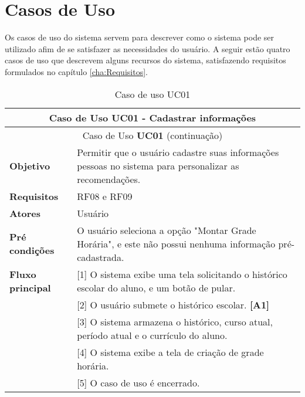 
\chapter{Casos de Uso}
\label{cha:Casos de Uso}

Os casos de uso do sistema servem para descrever como o sistema pode ser utilizado afim
de se satisfazer as necessidades do usuário. A seguir estão quatro casos de uso que descrevem alguns recursos do sistema, satisfazendo requisitos formulados no capítulo \ref{cha:Requisitos}.


\begin{longtable}{ | m{} | m{} | }
    
    \hline\hline
    
    \multicolumn{2}{|c|}{Caso de Uso \textbf{UC01} - Cadastrar informações}\tabularnewline\hline\hline
    \endfirsthead

    \hline\hline
    \multicolumn{2}{|c|}{Caso de Uso \textbf{UC01} (continuação)}\tabularnewline\hline\hline
    \endhead

    \hline
    \endfoot

    \hline
    \caption{Caso de uso UC01}
    \endlastfoot

    \textbf{Objetivo} & Permitir que o usuário cadastre suas informações pessoas no sistema para personalizar as recomendações.\tabularnewline\hline
    
    \textbf{Requisitos} & RF08 e RF09\tabularnewline\hline

    \textbf{Atores} & Usuário\tabularnewline\hline

    \textbf{Pré condições} & O usuário seleciona a opção "Montar Grade Horária", e este não possui nenhuma informação pré-cadastrada.\tabularnewline\hline

    \multirow{1}{*}{\textbf{Fluxo principal}} & [1] O sistema exibe uma tela solicitando o histórico escolar do aluno, e um botão de pular.\tabularnewline\cline{2-2}
    & [2] O usuário submete o histórico escolar. \textbf{[A1]}\tabularnewline\cline{2-2}
    & [3] O sistema armazena o histórico, curso atual, período atual e o currículo do aluno.\tabularnewline\cline{2-2}
    & [4] O sistema exibe a tela de criação de grade horária.\tabularnewline\cline{2-2}
    & [5] O caso de uso é encerrado.\tabularnewline\hline


\end{longtable}

